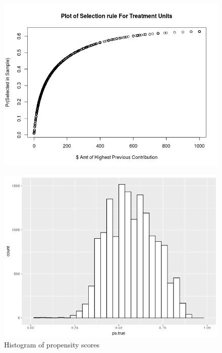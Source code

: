 \documentclass{article}
\begin{document}
\begin{figure}
\label{dc}
\center
\includegraphics[scale=1]{select_t.png}
\end{figure}

\begin{figure}
\label{ps}
\center
\caption{Histogram of propensity scores}
\includegraphics[scale=1]{pscores.png}
\end{figure}
\end{document}
